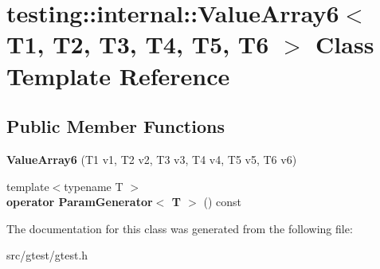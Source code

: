 \hypertarget{classtesting_1_1internal_1_1_value_array6}{}\section{testing\+:\+:internal\+:\+:Value\+Array6$<$ T1, T2, T3, T4, T5, T6 $>$ Class Template Reference}
\label{classtesting_1_1internal_1_1_value_array6}
\subsection*{Public Member Functions}
\begin{DoxyCompactItemize}
\item 
\mbox{\label{classtesting_1_1internal_1_1_value_array6_ad1c323929591d89807220281ceb6d4d5}} 
{\bfseries Value\+Array6} (T1 v1, T2 v2, T3 v3, T4 v4, T5 v5, T6 v6)
\item 
\mbox{\label{classtesting_1_1internal_1_1_value_array6_ab6cb557146bca7cf5fcfa40f10dee9da}} 
{\footnotesize template$<$typename T $>$ }\\{\bfseries operator Param\+Generator$<$ T $>$} () const
\end{DoxyCompactItemize}


The documentation for this class was generated from the following file\+:\begin{DoxyCompactItemize}
\item 
src/gtest/gtest.\+h\end{DoxyCompactItemize}
